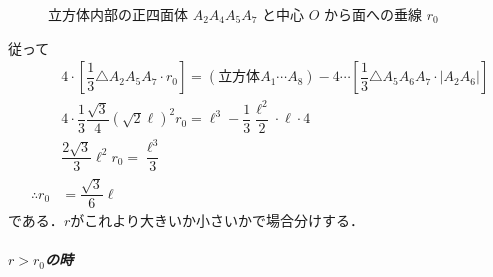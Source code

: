\documentclass[../../main.tex]{subfiles}
\begin{document}
\begin{figure}[htb]
\begin{tikzpicture}[tdplot_main_coords, scale=2.5, >=stealth, every node/.style={font=\small}]
  \end{tikzpicture}
  \caption{立方体内部の正四面体 $A_2A_4A_5A_7$ と中心 $O$ から面への垂線 $r_0$}
  \label{fig:cube_inscribed_tetrahedron_r0}
\end{figure}

従って
\begin{align}
  & 4\cdot \left[\dfrac{1}{3}\triangle A_2A_5A_7\cdot r_0\right] = (\text{立方体}A_1\cdots A_8) - 4\cdots \left[\dfrac{1}{3}\triangle A_5A_6A_7 \cdot |A_2A_6|\right] \\
  & 4\cdot \dfrac{1}{3} \dfrac{\sqrt{3}}{4}(\sqrt{2}\ell)^2 r_0 = \ell^3 - \dfrac{1}{3}\dfrac{\ell^2}{2} \cdot \ell \cdot 4 \\
  & \dfrac{2\sqrt{3}}{3}\ell^2r_0 = \dfrac{\ell^3}{3} \\
  \therefore
  r_0 &= \dfrac{\sqrt{3}}{6}\ell
\end{align}
である．$r$がこれより大きいか小さいかで場合分けする．

\subparagraph{$r>r_0$の時}
\end{document}
